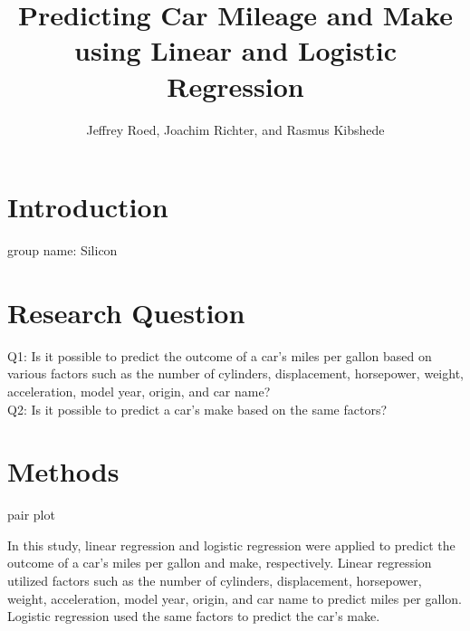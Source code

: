 \documentclass[a4paper, twocolumn]{article}
\author{Jeffrey Roed, Joachim Richter, and Rasmus Kibshede}
\title{Predicting Car Mileage and Make using Linear and Logistic Regression}
\begin{document}
\twocolumn[
    \begin{@twocolumnfalse}
        \maketitle
        \begin{abstract}
            
        \end{abstract}
    \end{@twocolumnfalse}
    \vspace{1cm}
]


\section{Introduction\label{sec:Introduction}}
group name: Silicon


\section{Research Question\label{sec:Research Question}}
Q1: Is it possible to predict the outcome of a car's miles per gallon based on various factors such as the number of cylinders, displacement, horsepower, weight, acceleration, model year, origin, and car name?\\
Q2: Is it possible to predict a car's make based on the same factors? 


\section{Methods\label{sec:Methods}}

pair plot

In this study, linear regression and logistic regression were applied to predict the outcome of a car's miles per gallon and make, respectively. Linear regression utilized factors such as the number of cylinders, displacement, horsepower, weight, acceleration, model year, origin, and car name to predict miles per gallon. Logistic regression used the same factors to predict the car's make.
\end{document}
